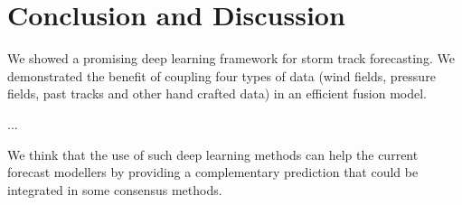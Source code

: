\chapter{Conclusion and Discussion}

We showed a promising deep learning framework for storm track forecasting. We demonstrated the benefit of coupling four types of data (wind fields, pressure fields, past tracks and other hand crafted data) in an efficient fusion model. 

...

We think that the use of such deep learning methods can help the current forecast modellers by providing a complementary prediction that could be integrated in some consensus methods.

